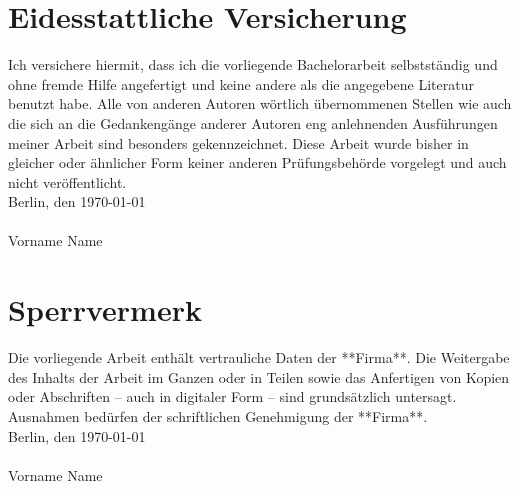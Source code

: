 \section*{Eidesstattliche Versicherung}
Ich versichere hiermit, dass ich die vorliegende Bachelorarbeit selbstständig und ohne fremde Hilfe angefertigt und keine andere als die angegebene Literatur benutzt habe. Alle von anderen Autoren wörtlich übernommenen Stellen wie auch die sich an die Gedankengänge anderer Autoren eng anlehnenden Ausführungen meiner Arbeit sind besonders gekennzeichnet. Diese Arbeit wurde bisher in gleicher oder ähnlicher Form keiner anderen Prüfungsbehörde vorgelegt und auch nicht veröffentlicht.\\
Berlin, den {\today} 
\\\\
Vorname Name 

\pagebreak
\section*{Sperrvermerk}

Die vorliegende Arbeit enthält vertrauliche Daten der **Firma**. Die Weitergabe des Inhalts der Arbeit im Ganzen oder in Teilen sowie das Anfertigen von Kopien oder Abschriften -- auch in digitaler Form -- sind grundsätzlich untersagt. Ausnahmen bedürfen der schriftlichen Genehmigung der **Firma**.\\
Berlin, den {\today} 
\\\\
Vorname Name 
\pagebreak
